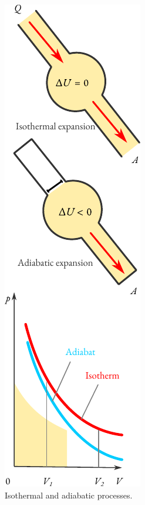 \begin{figure}
\centering
\includegraphics[width=0.8\linewidth]{figures/isotherm-adia.pdf}
\caption{Isothermal and adiabatic processes.\label{iso-adia}}
\end{figure}



